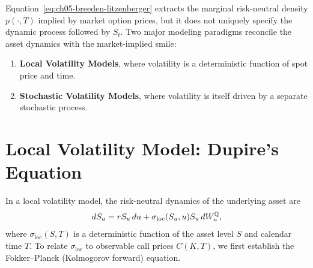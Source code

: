 \begin{note}
    Equation~\eqref{eq:ch05-breeden-litzenberger} extracts the marginal risk-neutral density $p(\cdot, T)$ implied by market option prices, but it does not uniquely specify the dynamic process followed by $S_t$. Two major modeling paradigms reconcile the asset dynamics with the market-implied smile:
    \begin{enumerate}
        \item \textbf{Local Volatility Models}, where volatility is a deterministic function of spot price and time.
        \item \textbf{Stochastic Volatility Models}, where volatility is itself driven by a separate stochastic process.
    \end{enumerate}
\end{note}

\section{Local Volatility Model: Dupire's Equation}
\label{sec:ch05-dupire}

In a local volatility model, the risk-neutral dynamics of the underlying asset are
\[
    dS_u = r S_u\,du + \sigma_{\mathrm{loc}}(S_u, u) S_u\,dW_u^{\mathbb{Q}},
\]
where $\sigma_{\mathrm{loc}}(S, T)$ is a deterministic function of the asset level $S$ and calendar time $T$. To relate $\sigma_{\mathrm{loc}}$ to observable call prices $C(K, T)$, we first establish the Fokker--Planck (Kolmogorov forward) equation.

